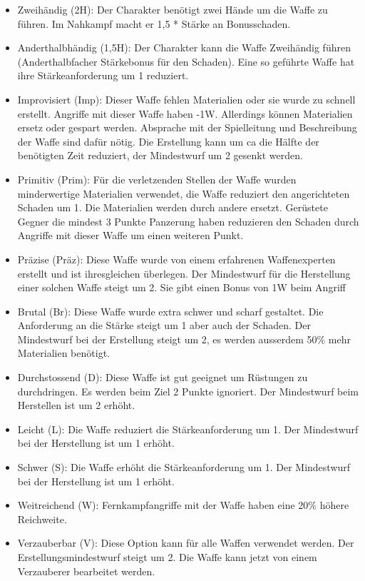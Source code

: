 \documentclass{article}
\begin{document}
\begin{itemize}
\item Zweihändig (2H): Der Charakter benötigt zwei Hände um die Waffe zu führen. Im Nahkampf macht er 1,5 * Stärke an Bonusschaden.
\item Anderthalbhändig (1,5H): Der Charakter kann die Waffe Zweihändig führen (Anderthalbfacher Stärkebonus für den Schaden). Eine so geführte Waffe hat ihre Stärkeanforderung um 1 reduziert.
\item Improvisiert (Imp): Dieser Waffe fehlen Materialien oder sie wurde zu schnell erstellt. Angriffe mit dieser Waffe haben -1W. Allerdings können Materialien ersetz oder gespart werden. Absprache mit der Spielleitung und Beschreibung der Waffe sind dafür nötig. Die Erstellung kann um ca die Hälfte der benötigten Zeit reduziert, der Mindestwurf um 2 gesenkt werden.
\item Primitiv (Prim): Für die verletzenden Stellen der Waffe wurden minderwertige Materialien verwendet, die Waffe reduziert den angerichteten Schaden um 1. Die Materialien werden durch andere ersetzt. Gerüstete Gegner die mindest 3 Punkte Panzerung haben reduzieren den Schaden durch Angriffe mit dieser Waffe um einen weiteren Punkt.
\item Präzise (Präz): Diese Waffe wurde von einem erfahrenen Waffenexperten erstellt und ist ihresgleichen überlegen. Der Mindestwurf für die Herstellung einer solchen Waffe steigt um 2. Sie gibt einen Bonus von 1W beim Angriff
\item Brutal (Br): Diese Waffe wurde extra schwer und scharf gestaltet. Die Anforderung an die Stärke steigt um 1 aber auch der Schaden. Der Mindestwurf bei der Erstellung steigt um 2, es werden ausserdem 50\% mehr Materialien benötigt.
\item Durchstossend (D): Diese Waffe ist gut geeignet um Rüstungen zu durchdringen. Es werden beim Ziel 2 Punkte ignoriert. Der Mindestwurf beim Herstellen ist um 2 erhöht.
\item Leicht (L): Die Waffe reduziert die Stärkeanforderung um 1. Der Mindestwurf bei der Herstellung ist um 1 erhöht.
\item Schwer (S): Die Waffe erhöht die Stärkeanforderung um 1. Der Mindestwurf bei der Herstellung ist um 1 erhöht.
\item Weitreichend (W): Fernkampfangriffe mit der Waffe haben eine 20\% höhere Reichweite.
\item Verzauberbar (V): Diese Option kann für alle Waffen verwendet werden. Der Erstellungsmindestwurf steigt um 2. Die Waffe kann jetzt von einem Verzauberer bearbeitet werden.
\end{itemize}
\end{document}
